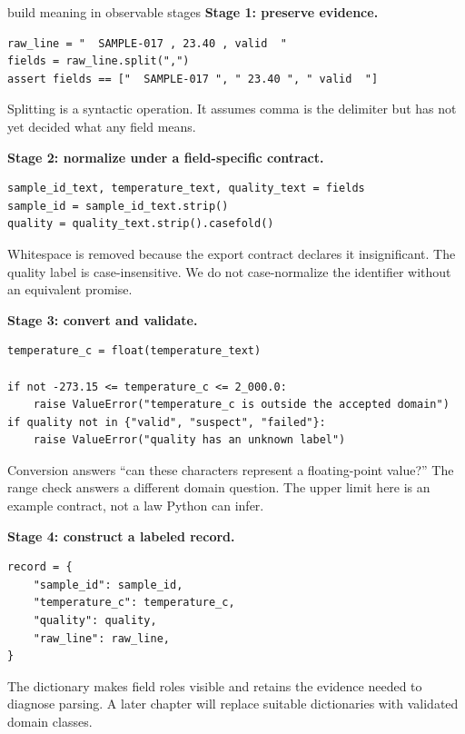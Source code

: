 \begin{workedexample}{build meaning in observable stages}
\textbf{Stage 1: preserve evidence.}

\begin{lstlisting}
raw_line = "  SAMPLE-017 , 23.40 , valid  "
fields = raw_line.split(",")
assert fields == ["  SAMPLE-017 ", " 23.40 ", " valid  "]
\end{lstlisting}

Splitting is a syntactic operation. It assumes comma is the delimiter but has
not yet decided what any field means.

\textbf{Stage 2: normalize under a field-specific contract.}

\begin{lstlisting}
sample_id_text, temperature_text, quality_text = fields
sample_id = sample_id_text.strip()
quality = quality_text.strip().casefold()
\end{lstlisting}

Whitespace is removed because the export contract declares it insignificant.
The quality label is case-insensitive. We do not case-normalize the identifier
without an equivalent promise.

\textbf{Stage 3: convert and validate.}

\begin{lstlisting}
temperature_c = float(temperature_text)

if not -273.15 <= temperature_c <= 2_000.0:
    raise ValueError("temperature_c is outside the accepted domain")
if quality not in {"valid", "suspect", "failed"}:
    raise ValueError("quality has an unknown label")
\end{lstlisting}

Conversion answers ``can these characters represent a floating-point value?''
The range check answers a different domain question. The upper limit here is an
example contract, not a law Python can infer.

\textbf{Stage 4: construct a labeled record.}

\begin{lstlisting}
record = {
    "sample_id": sample_id,
    "temperature_c": temperature_c,
    "quality": quality,
    "raw_line": raw_line,
}
\end{lstlisting}

The dictionary makes field roles visible and retains the evidence needed to
diagnose parsing. A later chapter will replace suitable dictionaries with
validated domain classes.
\end{workedexample}

